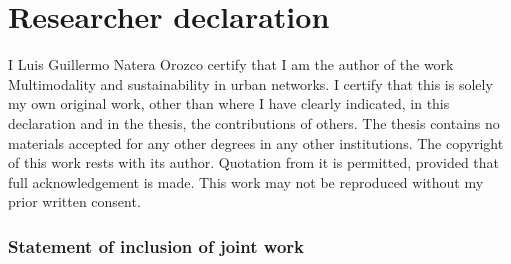 \documentclass[a4paper,twoside,12pt]{book}
\begin{document}
\newpage


\chapter*{Researcher declaration}
I Luis Guillermo Natera Orozco certify that I am the author of the work Multimodality and sustainability in urban networks. I certify that this is solely my own original work, other than where I have clearly indicated, in this declaration and in the thesis, the contributions of others. The thesis contains no materials accepted for any other degrees in any other institutions.  The copyright of this work rests with its author. Quotation from it is permitted, provided that full acknowledgement is made. This work may not be reproduced without my prior written consent.

\subsection*{Statement of inclusion of joint work}

\vspace{.2cm}



\vspace{.2cm}

\noindent
\end{document}
